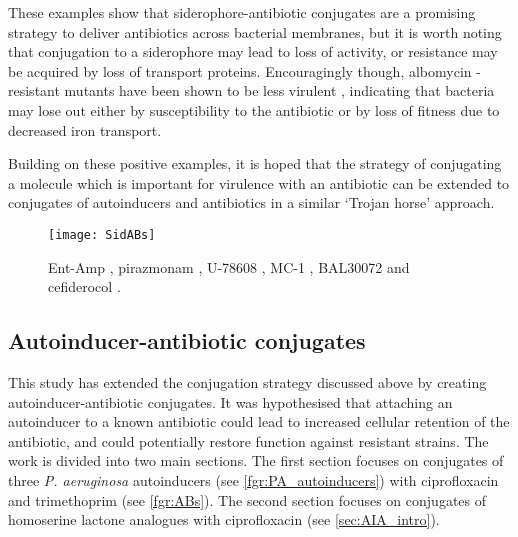 These examples show that siderophore-antibiotic conjugates are a promising strategy to deliver antibiotics across bacterial membranes, but it is worth noting that conjugation to a siderophore may lead to loss of activity, or resistance may be acquired by loss of transport proteins. Encouragingly though, albomycin -resistant mutants have been shown to be less virulent \cite{Pramanik2007}, indicating that bacteria may lose out either by susceptibility to the antibiotic or by loss of fitness due to decreased iron transport. 

Building on these positive examples, it is hoped that the strategy of conjugating a molecule which is important for virulence\cite{Vasil1999} with an antibiotic can be extended to conjugates of autoinducers and antibiotics in a similar `Trojan horse' approach.

\begin{figure}[H]
	\begin{center}
		\texttt{[image: SidABs]}
		\caption{Ent-Amp \cite{Zheng2014}, 
		pirazmonam \cite{Zurenko1990,Harrington2012}, 
		U-78608 ,\cite{Zurenko1990,Harrington2012} 
		MC-1 \cite{McPherson2012},  
		BAL30072 \cite{Page2013}
		and cefiderocol \cite{Ito2018,Saisho2018}.
		\label{fgr:SidABs}}
	\end{center}
\end{figure}



\subsection{Autoinducer-antibiotic conjugates\label{sec:AIABs}}

This study has extended the conjugation strategy discussed above by creating autoinducer-antibiotic conjugates. It was hypothesised that attaching an autoinducer to a known antibiotic could lead to increased cellular retention of the antibiotic, and could potentially restore function against resistant strains.
The work is divided into two main sections. The first section focuses on conjugates of three \textit{P. aeruginosa} autoinducers (see \ref{fgr:PA_autoinducers}) with ciprofloxacin and trimethoprim (see \ref{fgr:ABs}).
The second section focuses on conjugates of homoserine lactone analogues with ciprofloxacin (see \ref{sec:AIA_intro}).

